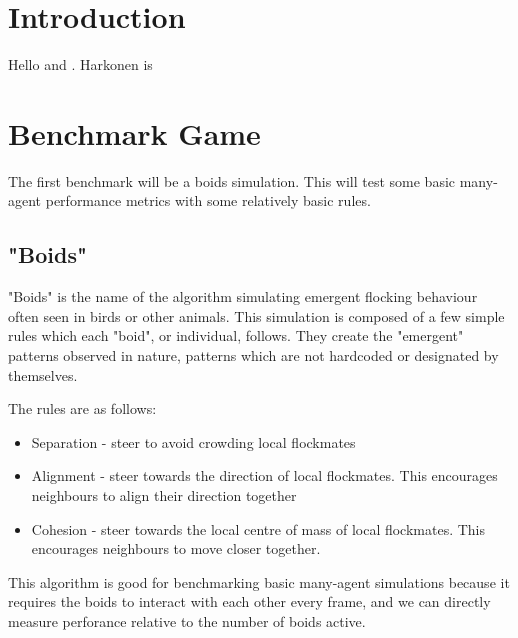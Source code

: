 \documentclass{article}
\begin{document}


\section{Introduction}

Hello \cite{DocFX} and \cite{Gregory2014Game}. Harkonen is \cite{harkonen2019advantages}

\section{Benchmark Game}

The first benchmark will be a boids simulation.
This will test some basic many-agent performance metrics with some relatively basic rules.

\subsection{"Boids"}

"Boids" is the name of the algorithm simulating emergent flocking behaviour often seen in birds or other animals.
This simulation is composed of a few simple rules which each "boid", or individual, follows.
They create the "emergent" patterns observed in nature, patterns which are not hardcoded or designated by themselves.

The rules are as follows:
\begin{itemize}
    \item Separation - steer to avoid crowding local flockmates
    \item Alignment - steer towards the direction of local flockmates.
          This encourages neighbours to align their direction together
    \item Cohesion - steer towards the local centre of mass of local flockmates.
          This encourages neighbours to move closer together.
\end{itemize}

This algorithm is good for benchmarking basic many-agent simulations because it requires the boids to interact with each other
every frame, and we can directly measure perforance relative to the number of boids active.



\end{document}
